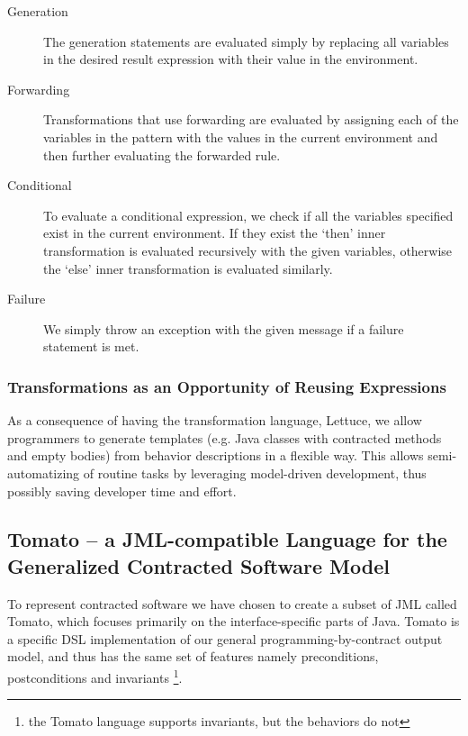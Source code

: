 \begin{description}
  \item[Generation] The generation statements are evaluated simply
    by replacing all variables in the desired result expression with their 
    value in the environment. 
  \item[Forwarding] Transformations that use forwarding are evaluated by
    assigning each of the variables in the pattern with the values in the
    current environment and then further evaluating the forwarded rule.
  \item[Conditional] To evaluate a conditional expression, we check if all
    the variables specified exist in the current environment.
    If they exist the `then' inner transformation is evaluated recursively
    with the given variables, otherwise the `else' inner transformation
    is evaluated similarly.
  \item[Failure] We simply throw an exception with the given message
    if a failure statement is met.
\end{description}

\subsubsection{Transformations as an Opportunity of Reusing Expressions}
\label{ssub:TransformationsasanOppurtunityofReusingExpressions}
As a consequence of having the transformation language, Lettuce,
we allow programmers to generate templates (e.g. Java classes with contracted methods and empty bodies) from behavior descriptions in a flexible way. This allows semi-automatizing of routine tasks by leveraging model-driven development, thus possibly saving developer time and effort.


\subsection{Tomato -- a JML-compatible Language for the Generalized Contracted Software Model}
\label{sub:Tomato-aJML-compatibleLanguagefortheGeneralizedContractedSoftwareModel}


To represent contracted software we have chosen to create a subset of JML called Tomato,
which focuses primarily on the interface-specific parts of Java.
Tomato is a specific DSL implementation of our general programming-by-contract output model, and thus has the same set of features
namely preconditions, postconditions and invariants \footnote{the Tomato language supports invariants, but the behaviors do not}.

